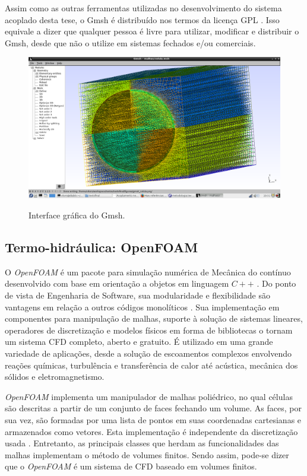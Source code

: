 Assim como as outras ferramentas utilizadas no desenvolvimento do sistema acoplado desta tese,
o Gmsh é distribuído nos termos da licença GPL \cite{gplv3}. Isso equivale a dizer que
qualquer pessoa é livre para utilizar, modificar e distribuir o Gmsh, desde que não o utilize
em sistemas fechados e/ou comerciais.

\begin{figure}[htb]
  \caption{Interface gráfica do Gmsh. }
  \centering\includegraphics[scale=0.45]{figuras/gmsh_celula.png}
  \label{fig:gui-gmsh}
\end{figure}


\subsection{Termo-hidráulica: \textbf{OpenFOAM}}
\label{subsection:openfoam}

O \textit{OpenFOAM} é um pacote para simulação numérica de Mecânica
do contínuo desenvolvido com base em orientação a objetos em linguagem $C++$ .
Do ponto de vista de Engenharia de Software, sua modularidade e flexibilidade são vantagens
em relação a outros códigos monolíticos  \cite{Jasak2007}. Sua implementação em componentes para manipulação de malhas, suporte
à solução de sistemas lineares, operadores de discretização e modelos físicos em forma de bibliotecas o tornam
um sistema CFD completo, aberto e gratuito. É utilizado em uma grande variedade
de aplicações, desde a solução de escoamentos complexos envolvendo reações químicas, turbulência e
transferência de calor até acústica, mecânica dos sólidos e eletromagnetismo. 

\textit{OpenFOAM} implementa um manipulador de malhas poliédrico, no qual células são descritas a partir
de um conjunto de faces fechando um volume. As faces, por sua vez, são formadas por uma lista de pontos
em suas coordenadas cartesianas e armazenados como vetores. Esta implementação é independente da discretização
usada \cite{Jasak2009}. Entretanto, as principais classes que herdam as funcionalidades das malhas implementam o método de
volumes finitos. Sendo assim, pode-se dizer que o \textit{OpenFOAM} é um sistema de CFD baseado em volumes
finitos.


